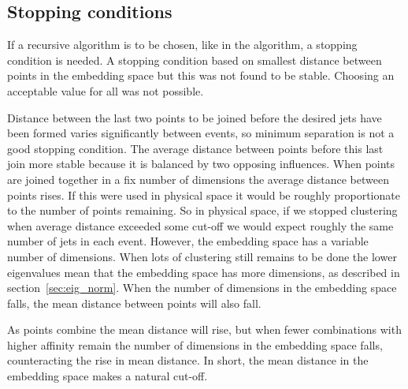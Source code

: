 \subsection{Stopping conditions}\label{sec:stopping_condintion}

If a recursive algorithm is to be chosen, like in the \genkt{} algorithm, a stopping condition is needed.
A stopping condition based on smallest distance between points in the embedding space 
but this was not found to be stable.
Choosing an acceptable value for all was not possible.

Distance between the last two points to be joined before the desired jets have been formed
 varies significantly between events, so minimum separation is not a good stopping condition.
The average distance between points before this last join more stable because it 
is balanced by two opposing influences.
When points are joined together in a fix number of dimensions the average
distance between points rises.
If this were used in physical space it would be roughly proportionate to the number of points remaining.
So in physical space, if we stopped clustering when average distance exceeded some cut-off
we would expect roughly the same number of jets in each event.
However, the embedding space has a variable number of dimensions.
When lots of clustering still remains to be done the lower eigenvalues mean that
the embedding space has more dimensions,
as described in section~\ref{sec:eig_norm}.
When the number of dimensions in the embedding space falls,
the mean distance between points will also fall.

As points combine the mean distance will rise,
but when fewer combinations with higher affinity remain the number of
dimensions in the embedding space falls, counteracting the rise in mean distance.
In short, the mean distance in the embedding space makes a natural cut-off.
